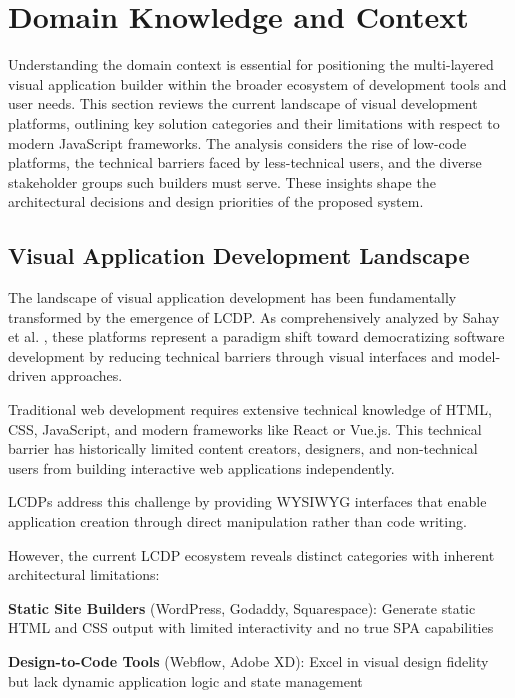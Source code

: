 \documentclass[oneside,12pt]{book}
\begin{document}
\section{Domain Knowledge and Context}
\label{sec:domain-context}

Understanding the domain context is essential for positioning the multi-layered visual application builder within the broader ecosystem of development tools and user needs. This section reviews the current landscape of visual development platforms, outlining key solution categories and their limitations with respect to modern JavaScript frameworks. The analysis considers the rise of low-code platforms, the technical barriers faced by less-technical users, and the diverse stakeholder groups such builders must serve. These insights shape the architectural decisions and design priorities of the proposed system.

\subsection{Visual Application Development Landscape}

The landscape of visual application development has been fundamentally transformed by the emergence of \gls{LCDP}. As comprehensively analyzed by Sahay et al. \cite{sahay2020supporting}, these platforms represent a paradigm shift toward democratizing software development by reducing technical barriers through visual interfaces and model-driven approaches.

Traditional web development requires extensive technical knowledge of \gls{HTML}, \gls{CSS}, JavaScript, and modern frameworks like React or Vue.js. This technical barrier has historically limited content creators, designers, and non-technical users from building interactive web applications independently. 

\newpage
LCDPs address this challenge by providing \gls{WYSIWYG} interfaces that enable application creation through direct manipulation rather than code writing.

However, the current LCDP ecosystem reveals distinct categories with inherent architectural limitations:


\textbf{Static Site Builders} (WordPress, Godaddy, Squarespace): Generate static \gls{HTML} and \gls{CSS} output with limited interactivity and no true \gls{SPA} capabilities

\textbf{Design-to-Code Tools} (Webflow, Adobe XD): Excel in visual design fidelity but lack dynamic application logic and state management
\end{document}
